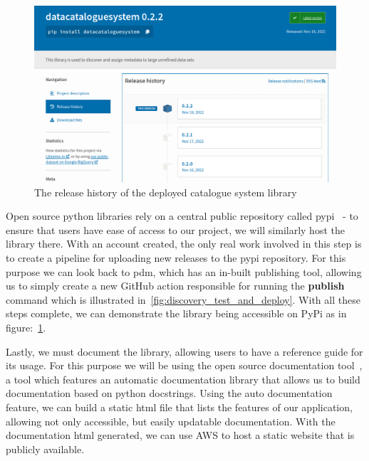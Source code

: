 \begin{figure}[H]
    \centering
    \includegraphics[width=12cm]{figures/discovery_library/pypi_catalogue_upload}
    \caption{The release history of the deployed catalogue system library}
    \label{fig:discovery_pypi_upload}
\end{figure}

Open source python libraries rely on a central public repository called pypi~\cite{PyPi} - to ensure that users have
ease of access to our project, we will similarly host the library there.
With an account created, the only real work involved in this step is to create a pipeline for uploading new releases to
the pypi repository.
For this purpose we can look back to pdm, which has an in-built publishing tool, allowing us to simply create a new
GitHub action responsible for running the \textbf{publish} command which is illustrated
in~\ref{fig:discovery_test_and_deploy}.
With all these steps complete, we can demonstrate the library being accessible on PyPi as in
figure:~\ref{fig:discovery_pypi_upload}.

Lastly, we must document the library, allowing users to have a reference guide for its usage.
For this purpose we will be using the open source documentation tool~\cite{Sphinx}, a tool which features an automatic
documentation library that allows us to build documentation based on python docstrings.
Using the auto documentation feature, we can build a static html file that lists the features of our application,
allowing not only accessible, but easily updatable documentation.
With the documentation html generated, we can use AWS to host a static website that is publicly available.

